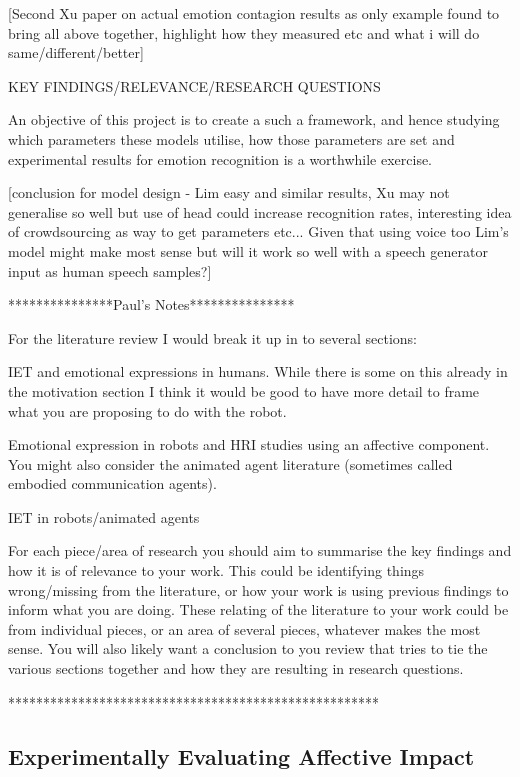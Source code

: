 \documentclass[11pt]{article}
\begin{document}
[Second Xu paper on actual emotion contagion results as only example found to bring all above together, highlight how they measured etc and what i will do same/different/better]


KEY FINDINGS/RELEVANCE/RESEARCH QUESTIONS

An objective of this project is to create a such a framework, and hence studying which parameters these models utilise, how those parameters are set and experimental results for emotion recognition is a worthwhile exercise.

[conclusion for model design - Lim easy and similar results, Xu may not generalise so well but use of head could increase recognition rates, interesting idea of crowdsourcing as way to get parameters etc... Given that using voice too Lim's model might make most sense but will it work so well with a speech generator input as human speech samples?]

***************Paul's Notes***************

For the literature review I would break it up in to several sections:

IET and emotional expressions in humans. While there is some on this already in the motivation section I think it would be good to have more detail to frame what you are proposing to do with the robot.

Emotional expression in robots and HRI studies using an affective component. You might also consider the animated agent literature (sometimes called embodied communication agents).

IET in robots/animated agents

For each piece/area of research you should aim to summarise the key findings and how it is of relevance to your work. This could be identifying things wrong/missing from the literature, or how your work is using previous findings to inform what you are doing. These relating of the literature to your work could be from individual pieces, or an area of several pieces, whatever makes the most sense. You will also likely want a conclusion to you review that tries to tie the various sections together and how they are resulting in research questions.

*****************************************************

\subsection{Experimentally Evaluating Affective Impact}
\end{document}
